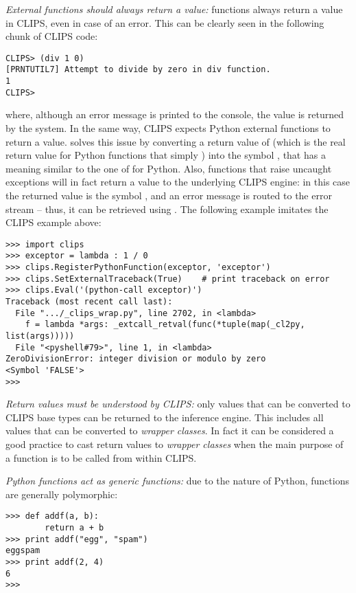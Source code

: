 \emph{External functions should always return a value:} functions always
return a value in CLIPS, even in case of an error. This can be clearly
seen in the following chunk of CLIPS code:

\begin{verbatim}
CLIPS> (div 1 0)
[PRNTUTIL7] Attempt to divide by zero in div function.
1
CLIPS>
\end{verbatim}

where, although an error message is printed to the console, the value
 is returned by the system. In the same way, CLIPS expects
Python external functions to return a value. \pyclips{} solves this issue
by converting a return value of  (which is the real return
value for Python functions that simply ) into the symbol
, that has a meaning similar to the one of  for
Python. Also, functions that raise uncaught exceptions will in fact return
a value to the underlying CLIPS engine: in this case the returned value
is the symbol , and an error message is routed to the error
stream -- thus, it can be retrieved using .
The following example imitates the  CLIPS example above:

\begin{verbatim}
>>> import clips
>>> exceptor = lambda : 1 / 0
>>> clips.RegisterPythonFunction(exceptor, 'exceptor')
>>> clips.SetExternalTraceback(True)	# print traceback on error
>>> clips.Eval('(python-call exceptor)')
Traceback (most recent call last):
  File ".../_clips_wrap.py", line 2702, in <lambda>
    f = lambda *args: _extcall_retval(func(*tuple(map(_cl2py, list(args)))))
  File "<pyshell#79>", line 1, in <lambda>
ZeroDivisionError: integer division or modulo by zero
<Symbol 'FALSE'>
>>>
\end{verbatim}

\emph{Return values must be understood by CLIPS:} only values that can
be converted to CLIPS base types can be returned to the inference engine.
This includes all values that can be converted to \pyclips{} \emph{wrapper
classes}. In fact it can be considered a good practice to cast return
values to \pyclips{} \emph{wrapper classes} when the main purpose of a
function is to be called from within CLIPS.

\emph{Python functions act as generic functions:} due to the nature of
Python, functions are generally polymorphic:

\begin{verbatim}
>>> def addf(a, b):
        return a + b
>>> print addf("egg", "spam")
eggspam
>>> print addf(2, 4)
6
>>>
\end{verbatim}

